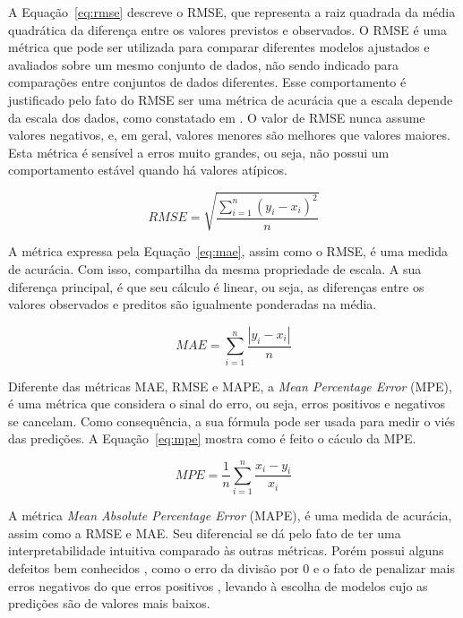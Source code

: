 A Equação~\ref{eq:rmse} descreve o RMSE, que representa a raiz quadrada da média quadrática da diferença entre os valores previstos e observados. O RMSE é uma métrica que pode ser utilizada para comparar diferentes modelos ajustados e avaliados sobre um mesmo conjunto de dados, não sendo indicado para comparações entre conjuntos de dados diferentes. Esse comportamento é justificado pelo fato do RMSE ser uma métrica de acurácia que a escala depende da escala dos dados, como constatado em \cite{HYNDMAN2006679}. O valor de RMSE nunca assume valores negativos, e, em geral, valores menores são melhores que valores maiores. Esta métrica é sensível a erros muito grandes, ou seja, não possui um comportamento estável quando há valores atípicos.

\begin{equation} \label{eq:rmse}
    RMSE=\sqrt{\dfrac{\sum ^{n}_{i=1}\left( y_{i}-x_{i}\right) ^{2}}{n}}
\end{equation}

A métrica expressa pela Equação~\ref{eq:mae}, assim como o RMSE, é uma medida de acurácia. Com isso, compartilha da mesma propriedade de escala. A sua diferença principal, é que seu cálculo é linear, ou seja, as diferenças entre os valores observados e preditos são igualmente ponderadas na média.

\begin{equation} \label{eq:mae}
    MAE=\sum ^{n}_{i=1}\dfrac{\left| y_{i}-x_{i}\right| }{n}
\end{equation}

Diferente das métricas MAE, RMSE e MAPE, a \textit{Mean Percentage Error} (MPE), é uma métrica que considera o sinal do erro, ou seja, erros positivos e negativos se cancelam. Como consequência, a sua fórmula pode ser usada para medir o viés das predições. A Equação~\ref{eq:mpe} mostra como é feito o cáculo da MPE.

\begin{equation} \label{eq:mpe}
    MPE=\dfrac{1}{n}\sum ^{n}_{i=1}\dfrac{x_{i}-y_{i}}{x_{i}}
\end{equation}

A métrica \textit{Mean Absolute Percentage Error} (MAPE), é uma medida de acurácia, assim como a RMSE e MAE. Seu diferencial se dá pelo fato de ter uma interpretabilidade intuitiva comparado às outras métricas. Porém possui alguns defeitos bem conhecidos \cite{CHRISTOFALLIS2015}, como o erro da divisão por 0 e o fato de penalizar mais erros negativos do que erros positivos \cite{MAKRIDAKIS1993527}, levando à escolha de modelos cujo as predições são de valores mais baixos.

